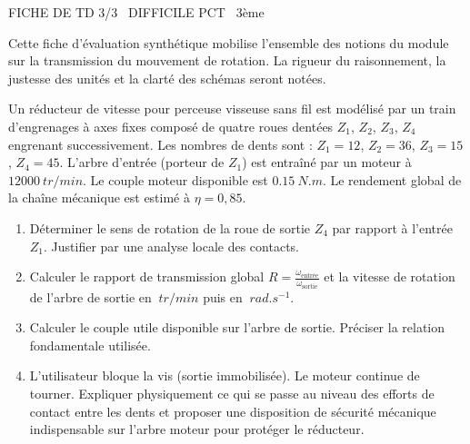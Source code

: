 \documentclass[11pt]{article}
\begin{document}
\begin{tcolorbox}[enhanced,colback=popink,colframe=popink,arc=10pt,boxrule=0pt,left=12pt,right=12pt,top=9pt,bottom=9pt]
{\color{white}\popxbold\small FICHE DE TD 3/3 \textbullet\ DIFFICILE \hfill PCT \textbullet\ 3ème\par}
\end{tcolorbox}
\vspace{4pt}
\noindent Cette fiche d'évaluation synthétique mobilise l'ensemble des notions du module sur la transmission du mouvement de rotation. La rigueur du raisonnement, la justesse des unités et la clarté des schémas seront notées.

\begin{exercice}
Un réducteur de vitesse pour perceuse visseuse sans fil est modélisé par un train d'engrenages à axes fixes composé de quatre roues dentées $Z_1$, $Z_2$, $Z_3$, $Z_4$ engrenant successivement. Les nombres de dents sont : $Z_1 = 12$, $Z_2 = 36$, $Z_3 = 15$, $Z_4 = 45$. L'arbre d'entrée (porteur de $Z_1$) est entraîné par un moteur à $\SI{12000}{tr/min}$. Le couple moteur disponible est $\SI{0.15}{N.m}$. Le rendement global de la chaîne mécanique est estimé à $\eta = 0,85$.

\begin{enumerate}
    \item Déterminer le sens de rotation de la roue de sortie $Z_4$ par rapport à l'entrée $Z_1$. Justifier par une analyse locale des contacts.
    \item Calculer le rapport de transmission global $R = \frac{\omega_{\text{entrée}}}{\omega_{\text{sortie}}}$ et la vitesse de rotation de l'arbre de sortie en $\SI{}{tr/min}$ puis en $\SI{}{rad.s^{-1}}$.
    \item Calculer le couple utile disponible sur l'arbre de sortie. Préciser la relation fondamentale utilisée.
    \item L'utilisateur bloque la vis (sortie immobilisée). Le moteur continue de tourner. Expliquer physiquement ce qui se passe au niveau des efforts de contact entre les dents et proposer une disposition de sécurité mécanique indispensable sur l'arbre moteur pour protéger le réducteur.
\end{enumerate}
\end{exercice}
\end{document}
